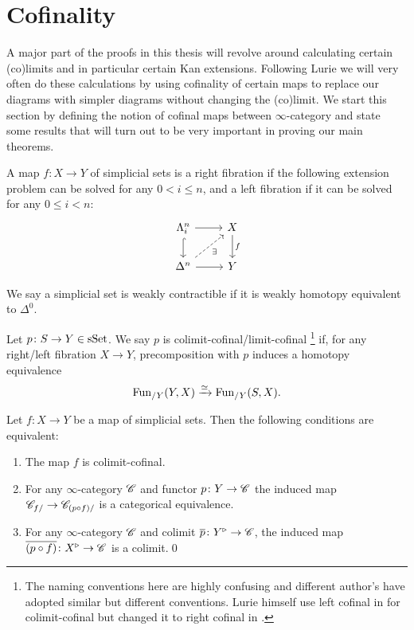\documentclass[../../thesis.tex]{subfiles}
\begin{document}
\section{Cofinality}
A major part of the proofs in this thesis will revolve around calculating certain (co)limits and in particular certain Kan extensions.
Following Lurie we will very often do these calculations by using cofinality of certain maps to replace our diagrams with simpler diagrams without changing the (co)limit.
We start this section by defining the notion of cofinal maps between $\infty$-category and state some results that will turn out to be very important in proving our main theorems.
\begin{definition}
    A map $f\colon X \to Y$ of simplicial sets is a right fibration if the following extension problem can be solved for any $0<i\leq n$, and a left fibration if it can be solved for any $0\leq i <n$:
    \[\begin{tikzcd}
            {\Lambda_i^n} & X \\
            {\Delta^n} & Y
            \arrow[from=1-1, to=1-2]
            \arrow[hook, from=1-1, to=2-1]
            \arrow[from=2-1, to=2-2]
            \arrow["f", from=1-2, to=2-2]
            \arrow["\exists"', dashed, from=2-1, to=1-2]
        \end{tikzcd}\]
\end{definition}
\begin{definition}
    We say a simplicial set is weakly contractible if it is weakly homotopy equivalent to $\Delta^0$.
\end{definition}
\begin{definition}{\cite[\href{https://kerodon.net/tag/02N1}{Definition 02N1}]{kerodon}}
    Let \(p\colon S\to Y \in \mathrm{sSet} \). We say $p$ is colimit-cofinal/limit-cofinal
    \footnote{The naming conventions here are highly confusing and different author's have adopted similar but different conventions. Lurie himself use left cofinal in \cite{HA} for colimit-cofinal but changed it to right cofinal in \cite{kerodon}.}
    if, for any right/left fibration $X\to Y$, precomposition with $p$ induces a homotopy equivalence
    \[
        \mathrm{Fun}_{/Y}(Y,X) \xrightarrow{\simeq} \mathrm{Fun}_{/Y}(S,X).
    \]
\end{definition}
\begin{proposition}
    Let $f\colon X \to Y$ be a map of simplicial sets.
    Then the following conditions are equivalent:
    \begin{enumerate}
        \item The map $f$ is colimit-cofinal.
        \item For any $\infty$-category $\mathscr{C}$ and functor $p\colon Y \to \mathscr{C}$ the induced map $\mathscr{C}_{f/} \to \mathscr{C}_{(p \circ f)/}$ is a categorical equivalence.
        \item For any $\infty$-category $\mathscr{C}$ and colimit $\overline{p}\colon Y^{\triangleright} \to \mathscr{C}$, the induced map $\overline{(p \circ f)}\colon X^{\triangleright}\to \mathscr{C}$ is a colimit.\qed
    \end{enumerate}
\end{proposition}
\end{document}

